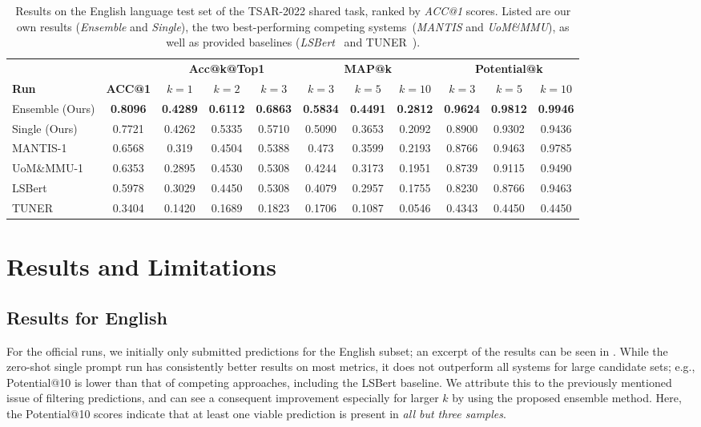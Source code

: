 \documentclass[11pt]{article}
\begin{document}
\begin{table*}
	\hspace*{-0.35cm}
	\setlength{\tabcolsep}{4pt}
\centering
\begin{tabular}{l|c|ccc|ccc|ccc}
 	&       & \multicolumn{3}{|c|}{\textbf{Acc@k@Top1}} & \multicolumn{3}{c|}{\textbf{MAP@k}} & \multicolumn{3}{c}{\textbf{Potential@k}}\\
\textbf{Run} & \textbf{ACC@1} & $k=1$ & $k=2$ & $k=3$ & $k=3$ & $k=5$ & $k=10$ & $k=3$ & $k=5$ & $k=10$\\
\hline
Ensemble (Ours) & \textbf{0.8096} & \textbf{0.4289} & \textbf{0.6112} & \textbf{0.6863} & \textbf{0.5834} & \textbf{0.4491} & \textbf{0.2812} & \textbf{0.9624} & \textbf{0.9812} & \textbf{0.9946}\\
Single (Ours) & 0.7721 & 0.4262 & 0.5335 & 0.5710 & 0.5090 & 0.3653 & 0.2092 & 0.8900 & 0.9302 & 0.9436\\
\hline
MANTIS-1 & 0.6568 & 0.319 & 0.4504 & 0.5388 & 0.473 & 0.3599 & 0.2193 & 0.8766 & 0.9463 & 0.9785\\
UoM\&MMU-1 & 0.6353 & 0.2895 & 0.4530 & 0.5308 & 0.4244 & 0.3173 & 0.1951 & 0.8739 & 0.9115 & 0.9490\\
LSBert & 0.5978 & 0.3029 & 0.4450 & 0.5308 & 0.4079 & 0.2957 & 0.1755 & 0.8230 & 0.8766 & 0.9463 \\
TUNER & 0.3404 & 0.1420 & 0.1689 & 0.1823 & 0.1706 & 0.1087 & 0.0546 & 0.4343 & 0.4450 & 0.4450 \\
\end{tabular}
\caption{Results on the English language test set of the TSAR-2022 shared task, ranked by \emph{ACC@1} scores. Listed are our own results (\emph{Ensemble} and  \emph{Single}), the two best-performing competing systems~(\emph{MANTIS} and \emph{UoM\&MMU}), as well as provided baselines (\emph{LSBert}~\cite{qiang-etal-2020-lexical} and TUNER~\cite{ferres-etal-2017-adaptable}).}
\label{tab:english}
\end{table*}


\section{Results and Limitations}

\subsection{Results for English}
For the official runs, we initially only submitted predictions for the English subset; an excerpt of the results can be seen in .
While the zero-shot single prompt run has consistently better results on most metrics, it does not outperform all systems for large candidate sets; e.g., Potential@10 is lower than that of competing approaches, including the LSBert baseline.
We attribute this to the previously mentioned issue of filtering predictions, and can see a consequent improvement especially for larger $k$ by using the proposed ensemble method. Here, the Potential@10 scores indicate that at least one viable prediction is present in \emph{all but three samples}.
\end{document}
